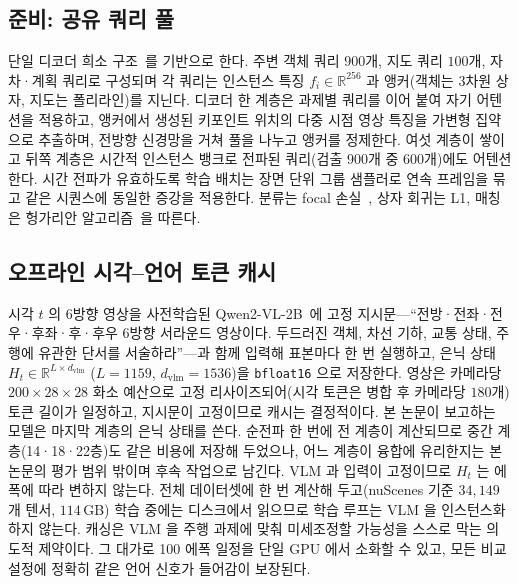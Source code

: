 \documentclass[conference]{IEEEtran}
\begin{document}
\subsection{준비: 공유 쿼리 풀}
단일 디코더 희소 구조~\cite{hipad2025}를 기반으로 한다. 주변 객체 쿼리 $900$개, 지도
쿼리 $100$개, 자차·계획 쿼리로 구성되며 각 쿼리는 인스턴스 특징
$f_i\in\mathbb{R}^{256}$ 과 앵커(객체는 3차원 상자, 지도는 폴리라인)를 지닌다. 디코더 한
계층은 과제별 쿼리를 이어 붙여 자기 어텐션을 적용하고, 앵커에서 생성된 키포인트 위치의
다중 시점 영상 특징을 가변형 집약으로 추출하며, 전방향 신경망을 거쳐 풀을 나누고 앵커를
정제한다. 여섯 계층이 쌓이고 뒤쪽 계층은 시간적 인스턴스 뱅크로 전파된 쿼리(검출 900개
중 600개)에도 어텐션한다. 시간 전파가 유효하도록 학습 배치는 장면 단위 그룹 샘플러로
연속 프레임을 묶고 같은 시퀀스에 동일한 증강을 적용한다. 분류는 focal
손실~\cite{lin2017focal}, 상자 회귀는 L1, 매칭은 헝가리안
알고리즘~\cite{kuhn1955hungarian}을 따른다.

\subsection{오프라인 시각--언어 토큰 캐시}
시각 $t$ 의 6방향 영상을 사전학습된 Qwen2-VL-2B~\cite{wang2024qwen2vl}에 고정
지시문---``전방·전좌·전우·후좌·후·후우 6방향 서라운드 영상이다. 두드러진 객체, 차선
기하, 교통 상태, 주행에 유관한 단서를 서술하라''---과 함께 입력해 표본마다 한 번
실행하고, 은닉 상태 $H_t \in \mathbb{R}^{L \times d_{\text{vlm}}}$ ($L{=}1159$,
$d_{\text{vlm}}{=}1536$)을 \texttt{bfloat16} 으로 저장한다. 영상은 카메라당
$200{\times}28{\times}28$ 화소 예산으로 고정 리사이즈되어(시각 토큰은 병합 후 카메라당
$180$개) 토큰 길이가 일정하고, 지시문이
고정이므로 캐시는 결정적이다. 본 논문이 보고하는 모델은 마지막 계층의 은닉 상태를 쓴다. 순전파 한 번에 전 계층이
계산되므로 중간 계층(14·18·22층)도 같은 비용에 저장해 두었으나, 어느 계층이 융합에
유리한지는 본 논문의 평가 범위 밖이며 후속 작업으로 남긴다. VLM 과 입력이 고정이므로 $H_t$ 는 에폭에
따라 변하지 않는다. 전체 데이터셋에 한 번 계산해 두고(nuScenes 기준 $34{,}149$개 텐서,
$114$\,GB) 학습 중에는 디스크에서 읽으므로 학습 루프는 VLM 을 인스턴스화하지 않는다.
캐싱은 VLM 을 주행 과제에 맞춰 미세조정할 가능성을 스스로 막는 의도적 제약이다. 그
대가로 100 에폭 일정을 단일 GPU 에서 소화할 수 있고, 모든 비교 설정에 정확히 같은
언어 신호가 들어감이 보장된다.
\end{document}
